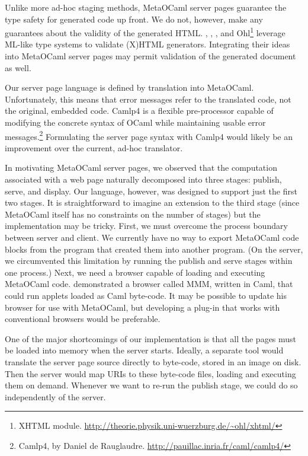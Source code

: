 \documentclass{elsart}
\def\MOC{MetaOCaml\xspace}
\begin{document}
Unlike more ad-hoc staging methods, \MOC server pages guarantee the
type safety for generated code up front.  We do not, however, make any
guarantees about the validity of the generated HTML.
\citet{elsman04typing}, \citet{wallace99haxml}, \citet{hosoya03xduce},
and Ohl\footnote{XHTML module.
  \url{http://theorie.physik.uni-wuerzburg.de/~ohl/xhtml/}} 
leverage ML-like type systems to validate (X)HTML generators.
Integrating their ideas into \MOC server pages may permit validation
of the generated document as well.


Our server page language is defined by translation into \MOC.
Unfortunately, this means that error messages refer to the translated
code, not the original, embedded code.  Camlp4 is a flexible
pre-processor capable of modifying the concrete syntax of OCaml while
maintaining usable error messages.\footnote{Camlp4, by Daniel de
  Rauglaudre.  \url{http://pauillac.inria.fr/caml/camlp4/}}
Formulating the server page syntax with Camlp4 would likely be an
improvement over the current, ad-hoc translator.

In motivating \MOC server pages, we observed that the computation
associated with a web page naturally decomposed into three stages:
publish, serve, and display.  Our language, however, was designed to
support just the first two stages.  It is straightforward to imagine
an extension to the third stage (since \MOC itself has no constraints
on the number of stages) but the implementation may be tricky.  First,
we must overcome the process boundary between server and client.  We
currently have no way to export \MOC code blocks from the program that
created them into another program.  (On the server, we circumvented
this limitation by running the publish and serve stages within one
process.)  Next, we need a browser capable of loading and executing
\MOC code.  \citet{rouaix96web} demonstrated a browser called MMM,
written in Caml, that could run applets loaded as Caml byte-code.  It
may be possible to update his browser for use with \MOC, but
developing a plug-in that works with conventional browsers would be
preferable.

One of the major shortcomings of our implementation is that all the
pages must be loaded into memory when the server starts.  Ideally, a
separate tool would translate the server page source directly to
byte-code, stored in an image on disk.  Then the server would map URIs
to these byte-code files, loading and executing them on demand.
Whenever we want to re-run the publish stage, we could do so
independently of the server.  
\end{document}
